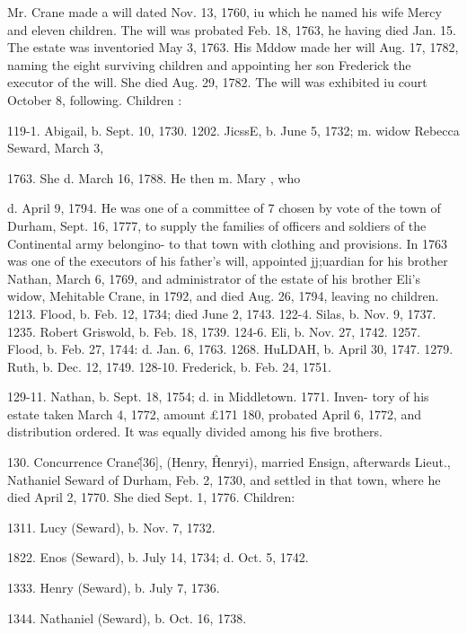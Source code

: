 Mr. Crane made a will dated Nov. 13, 1760, iu which he named 
his wife Mercy and eleven children. The will was probated Feb. 
18, 1763, he having died Jan. 15. The estate was inventoried 
May 3, 1763. His Mddow made her will Aug. 17, 1782, naming 
the eight surviving children and appointing her son Frederick the 
executor of the will. She died Aug. 29, 1782. The will was 
exhibited iu court October 8, following. 
Children : 

119-1. Abigail, b. Sept. 10, 1730. 
1202. JicssE, b. June 5, 1732; m. widow Rebecca Seward, March 3, 

1763. She d. March 16, 1788. He then m. Mary , who 

d. April 9, 1794. He was one of a committee of 7 chosen 
by vote of the town of Durham, Sept. 16, 1777, to supply 
the families of officers and soldiers of the Continental 
army belongino- to that town with clothing and provisions. 
In 1763 was one of the executors of his father's will, 
appointed jj;uardian for his brother Nathan, March 6, 1769, 
and administrator of the estate of his brother Eli's widow, 
Mehitable Crane, in 1792, and died Aug. 26, 1794, leaving 
no children. 
1213. Flood, b. Feb. 12, 1734; died June 2, 1743. 
122-4. Silas, b. Nov. 9, 1737. 
1235. Robert Griswold, b. Feb. 18, 1739. 
124-6. Eli, b. Nov. 27, 1742. 
1257. Flood, b. Feb. 27, 1744: d. Jan. 6, 1763. 
1268. HuLDAH, b. April 30, 1747. 
1279. Ruth, b. Dec. 12, 1749. 
128-10. Frederick, b. Feb. 24, 1751. 

129-11. Nathan, b. Sept. 18, 1754; d. in Middletown. 1771. Inven- 
tory of his estate taken March 4, 1772, amount £171  180, 
probated April 6, 1772, and distribution ordered. It was 
equally divided among his five brothers. 

130. Concurrence Crane\^ [36], (Henry, \^ Henryi), married 
Ensign, afterwards Lieut., Nathaniel Seward of Durham, Feb. 
2, 1730, and settled in that town, where he died April 2, 1770. 
She died Sept. 1, 1776. Children: 

1311. Lucy (Seward), b. Nov. 7, 1732. 

1822. Enos (Seward), b. July 14, 1734; d. Oct. 5, 1742. 

1333. Henry (Seward), b. July 7, 1736. 

1344. Nathaniel (Seward), b. Oct. 16, 1738. 




